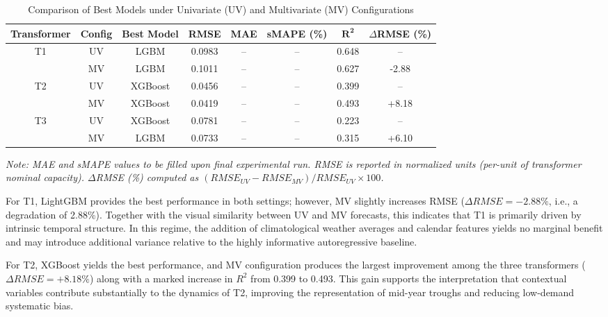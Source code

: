 \begin{table}[t]
\centering
\caption{Comparison of Best Models under Univariate (UV) and Multivariate (MV) Configurations}
\label{tab:final_comparison}
\footnotesize
\begin{tabular}{cccccccc}
\toprule
\textbf{Transformer} & \textbf{Config} & \textbf{Best Model} & \textbf{RMSE} & \textbf{MAE} & \textbf{sMAPE (\%)} & $\mathbf{R^2}$ & \textbf{$\Delta$RMSE (\%)} \\
\midrule

T1 & UV & LGBM & 0.0983 & -- & -- & 0.648 & -- \\
     & MV & LGBM & 0.1011 & -- & -- & 0.627 & -2.88 \\

\midrule

T2 & UV & XGBoost & 0.0456 & -- & -- & 0.399 & -- \\
     & MV & XGBoost & 0.0419 & -- & -- & 0.493 & +8.18 \\

\midrule

T3 & UV & XGBoost & 0.0781 & -- & -- & 0.223 & -- \\
     & MV & LGBM & 0.0733 & -- & -- & 0.315 & +6.10 \\

\bottomrule
\end{tabular}
\begin{minipage}{\textwidth}
\smallskip
\footnotesize \textit{Note: MAE and sMAPE values to be filled upon final experimental run. RMSE is reported in normalized units (per-unit of transformer nominal capacity). $\Delta$RMSE (\%) computed as $(RMSE_{UV} - RMSE_{MV})/RMSE_{UV} \times 100$.}
\end{minipage}
\end{table}


For T1, LightGBM provides the best performance in both settings; however, MV slightly increases RMSE ($\Delta RMSE = -2.88\%$, i.e., a degradation of 2.88\%). Together with the visual similarity between UV and MV forecasts, this indicates that T1 is primarily driven by intrinsic temporal structure. In this regime, the addition of climatological weather averages and calendar features yields no marginal benefit and may introduce additional variance relative to the highly informative autoregressive baseline.

For T2, XGBoost yields the best performance, and MV configuration produces the largest improvement among the three transformers ($\Delta RMSE = +8.18\%$) along with a marked increase in $R^2$ from 0.399 to 0.493. This gain supports the interpretation that contextual variables contribute substantially to the dynamics of T2, improving the representation of mid-year troughs and reducing low-demand systematic bias.


